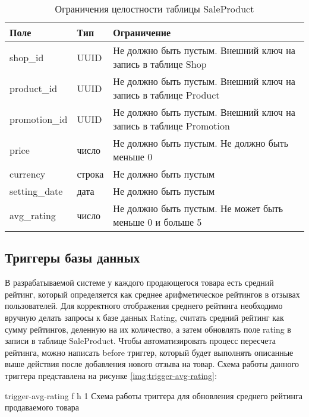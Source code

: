 \clearpage
\begin{table}[!h]
	\begin{center}
		\begin{threeparttable}
			\caption{Ограничения целостности таблицы SaleProduct}
			\label{tbl:entity_sale_product}
			\begin{tabular}{|p{4.5cm}|p{2.5cm}|p{8.5cm}|}
				\hline 
				\textbf{Поле} & \textbf{Тип} & \textbf{Ограничение}  \\
				\hline
				shop\_id & UUID & Не должно быть пустым. Внешний ключ на запись в таблице Shop  \\
				\hline
				product\_id & UUID & Не должно быть пустым. Внешний ключ на запись в таблице Product \\
				\hline
				promotion\_id & UUID & Не должно быть пустым. Внешний ключ на запись в таблице Promotion \\
				\hline
				price & число & Не должно быть пустым. Не должно быть меньше 0  \\
				\hline
				currency & строка & Не должно быть пустым  \\
				\hline
				setting\_date & дата & Не должно быть пустым  \\
				\hline
				avg\_rating & число & Не должно быть пустым. Не может быть меньше 0 и больше 5 \\
				\hline
			\end{tabular}
		\end{threeparttable}			
	\end{center}
\end{table}

\subsection{Триггеры базы данных}

В разрабатываемой системе у каждого продающегося товара есть средний рейтинг, который определяется как среднее арифметическое рейтингов в отзывах пользователей. Для корректного отображения среднего рейтинга необходимо вручную делать запросы к базе данных Rating, считать средний рейтинг как сумму рейтингов, деленную на их количество, а затем обновлять поле rating в записи в таблице SaleProduct. Чтобы автоматизировать процесс пересчета рейтинга, можно написать before триггер, который будет выполнять описанные выше действия после добавления нового отзыва на товар. Схема работы данного триггера представлена на рисунке \ref{img:trigger-avg-rating}: 

{trigger-avg-rating} %
{f} %
{h} %
{1\textwidth} %
{Схема работы триггера для обновления среднего рейтинга продаваемого товара} %


